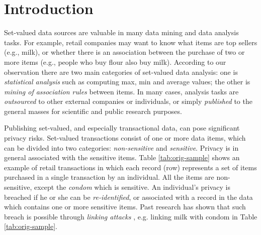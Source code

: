 \section{Introduction}
\label{sec:intro}

Set-valued data sources are valuable in many data mining and
data analysis tasks. For example, retail companies may want to know what
items are top sellers (e.g., milk), or whether there is an association
between the purchase of two or more items (e.g., people who buy flour also
buy milk). 
According to our observation there are two main categories of set-valued
data analysis: one is {\em statistical analysis} such as
computing max, min and average values; 
the other is {\em mining of association rules} between items. 
In many cases, analysis tasks 
are {\em outsourced} to other external companies or
individuals, or simply {\em published} to the general
masses for scientific and public research purposes.

Publishing set-valued, and especially transactional data,
can pose significant privacy risks.
Set-valued transactions consist of one or more data items, which can be divided into two categories: {\em non-sensitive} and {\em sensitive}.
Privacy is in general associated with the sensitive items.
Table \ref{tab:orig-sample} shows
an example of retail transactions in which each record (row) represents
a set of items purchased in a single transaction by an individual.
All the items are non-sensitive, except the {\em condom}
which is sensitive. An individual's privacy is breached if he or she can be
{\em re-identified}, or associated with a record in the data which contains
one or more sensitive items. 
Past research has shown that such breach is
possible through {\em linking attacks} \cite{FungWCY10:Survey}, e.g.
linking milk with condom in Table \ref{tab:orig-sample}. 

